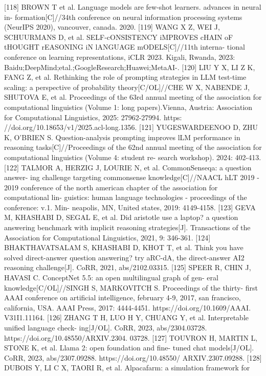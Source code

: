\documentclass[12pt,a4paper,openright,UTF8]{ctexbook}
\begin{document}
[118] BROWN T et al. Language models are few-shot learners. advances in neural in-
formation[C]//34th conference on neural information processing systems (NeurIPS
2020), vancouver, canada. 2020.
[119] WANG X Z, WEI J, SCHUURMANS D, et al. SELF-cONSISTENCY iMPROVES
cHAIN oF tHOUGHT rEASONING iN lANGUAGE mODELS[C]//11th interna-
tional conference on learning representations, iCLR 2023. Kigali, Rwanda, 2023:
Baidu;DeepMind;etal.;GoogleResearch;Huawei;MetaAI-.
[120] LIU Y X, LI Z K, FANG Z, et al. Rethinking the role of prompting strategies
in LLM test-time scaling: a perspective of probability theory[C/OL]//CHE W X,
NABENDE J, SHUTOVA E, et al. Proceedings of the 63rd annual meeting of
the association for computational linguistics (Volume 1: long papers).Vienna,
Austria: Association for Computational Linguistics, 2025: 27962-27994. https:
//doi.org/10.18653/v1/2025.acl-long.1356.
[121] YUGESWARDEENOO D, ZHU K, O’BRIEN S. Question-analysis prompting
improves lLM performance in reasoning tasks[C]//Proceedings of the 62nd annual
meeting of the association for computational linguistics (Volume 4: student re-
search workshop). 2024: 402-413.
[122] TALMOR A, HERZIG J, LOURIE N, et al. CommonSenseqa: a question answer-
ing challenge targeting commonsense knowledge[C]//NAACL hLT 2019 - 2019
conference of the north american chapter of the association for computational lin-
guistics: human language technologies - proceedings of the conference: v.1. Min-
neapolis, MN, United states, 2019: 4149-4158.
[123] GEVA M, KHASHABI D, SEGAL E, et al. Did aristotle use a laptop? a question
answering benchmark with implicit reasoning strategies[J]. Transactions of the
Association for Computational Linguistics, 2021, 9: 346-361.
[124] BHAKTHAVATSALAM S, KHASHABI D, KHOT T, et al. Think you have solved
direct-answer question answering? try aRC-dA, the direct-answer AI2 reasoning
challenge[J]. CoRR, 2021, abs/2102.03315.
[125] SPEER R, CHIN J, HAVASI C. ConceptNet 5.5: an open multilingual graph of gen-
eral knowledge[C/OL]//SINGH S, MARKOVITCH S. Proceedings of the thirty-
first AAAI conference on artificial intelligence, february 4-9, 2017, san francisco,
california, USA. AAAI Press, 2017: 4444-4451. https://doi.org/10.1609/AAAI.
V31I1.11164.
[126] ZHANG T H, LUO H Y, CHUANG Y, et al. Interpretable unified language check-
ing[J/OL]. CoRR, 2023, abs/2304.03728. https://doi.org/10.48550/ARXIV.2304.
03728.
[127] TOUVRON H, MARTIN L, STONE K, et al. Llama 2: open foundation and fine-
tuned chat models[J/OL]. CoRR, 2023, abs/2307.09288. https://doi.org/10.48550/
ARXIV.2307.09288.
[128] DUBOIS Y, LI C X, TAORI R, et al. Alpacafarm: a simulation framework for
\end{document}
